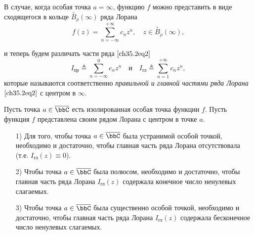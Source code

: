 В случае, когда особая точка $a = \infty$, функцию $f$ можно представить в виде сходящегося в кольце $\overset{\circ}{B}_\rho(\infty)$ ряда Лорана
\begin{equation} \label{ch35.2eq2}
f(z) = \sum_{n = -\infty}^{+\infty} c_n z^n, \quad z \in \overset{\circ}{B}_\rho(\infty),
\end{equation}

и теперь будем различать части ряда $\eqref{ch35.2eq2}$
$$
I_{\text{пр}} \triangleq \sum_{n = -\infty}^{0} c_n z^n \quad \text{и} \quad I_{\text{гл}} \triangleq \sum_{n = 1}^{+\infty} c_n z^n,
$$
которые называются соответственно \textit{правильной и главной частями ряда Лорана} $\eqref{ch35.2eq2}$ с центром в $\infty$.

\begin{leftbar}
\begin{thm}\label{Ch35.2Thm5}
Пусть точка $a \in \overline{\bbC}$ есть изолированная особая точка функции $f$. Пусть функция $f$  представлена своим рядом Лорана с центром в точке $a$.

\begin{enumerate}
\item[1)] Для того, чтобы точка $a \in \overline{\bbC}$ была устранимой особой точкой, необходимо и достаточно, чтобы главная часть ряда Лорана отсутствовала (т.е. $I_{\text{гл}}(z) \equiv 0$).
\item[2)]	Чтобы точка $a \in \overline{\bbC}$ была полюсом, необходимо и достаточно, чтобы главная часть ряда Лорана $I_{\text{гл}}(z)$ содержала конечное число ненулевых слагаемых.
\item[3)]	Чтобы точка $a \in \overline{\bbC}$ была существенно особой точкой, необходимо и достаточно, чтобы главная часть ряда Лорана $I_{\text{гл}}(z)$ содержала бесконечное число ненулевых слагаемых.
\end{enumerate}

\end{thm}
\end{leftbar}

